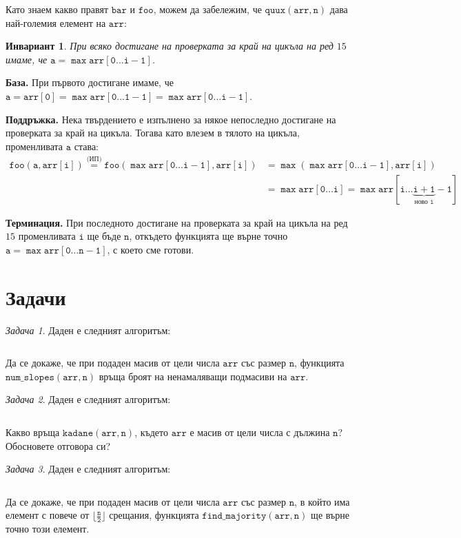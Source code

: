 \documentclass{article}
\theoremstyle{definition}
\theoremstyle{plain}
\newtheorem*{invariant}{Инвариант}
\theoremstyle{remark}
\newtheorem{problem}{Задача}
\theoremstyle{definition}
\begin{document}
Като знаем какво правят $\mathtt{bar}$ и $\mathtt{foo}$, можем да забележим, че $\mathtt{quux(arr, n)}$ дава най-големия елемент на $\mathtt{arr}$:
\begin{invariant}
    При всяко достигане на проверката за край на цикъла на ред $15$ имаме, че $\mathtt{a = \max arr[0 \dots i - 1]}$.
\end{invariant}

\textbf{База.}
При първото достигане имаме, че $\mathtt{a = arr[0] = \max arr[0 \dots 1 - 1] = \max arr[0 \dots i - 1]}$.

\textbf{Поддръжка.}
Нека твърдението е изпълнено за някое непоследно достигане на проверката за край на цикъла.
Тогава като влезем в тялото на цикъла, променливата $\mathtt{a}$ става:
\begin{align*}
    \mathtt{foo(a, arr[i]) \stackrel{\text{(ИП)}}{=} foo(\max arr[0 \dots i - 1], arr[i])} & = \mathtt{\max (\max arr[0 \dots i - 1], arr[i])}                                                  \\
                                                                                           & =\mathtt{\max arr[0 \dots i] = \max arr[i \dots \underbrace{\mathtt{i + 1}}_{\text{ново } i} - 1]}
\end{align*}

\textbf{Терминация.}
При последното достигане на проверката за край на цикъла на ред $15$ променливата $\mathtt{i}$ ще бъде $\mathtt{n}$, откъдето функцията ще върне точно $\mathtt{a = \max arr[0 \dots n - 1]}$, с което сме готови.

\section*{Задачи}

\begin{problem}
Даден е следният алгоритъм:
\inputminted[linenos]{c++}{algorithms/num_slopes.cpp}

Да се докаже, че при подаден масив от цели числа $\mathtt{arr}$ със размер $\mathtt{n}$, функцията $\mathtt{num\_slopes(arr, n)}$ връща броят на ненамаляващи подмасиви на $\mathtt{arr}$.
\end{problem}


\begin{problem}
Даден е следният алгоритъм:
\inputminted[linenos]{c++}{algorithms/kadane.cpp}

Какво връща $\mathtt{kadane(arr, n)}$, където $\mathtt{arr}$ е масив от цели числа с дължина $\mathtt{n}$?
Обосновете отговора си?
\end{problem}

\begin{problem}
Даден е следният алгоритъм:
\inputminted[linenos]{c++}{algorithms/find_majority.cpp}

Да се докаже, че при подаден масив от цели числа $\mathtt{arr}$ със размер $\mathtt{n}$, в който има елемент с повече от $\mathtt{\lfloor \frac{n}{2} \rfloor}$ срещания,
функцията $\mathtt{find\_majority(arr, n)}$ ще върне точно този елемент.
\end{problem}
\end{document}
